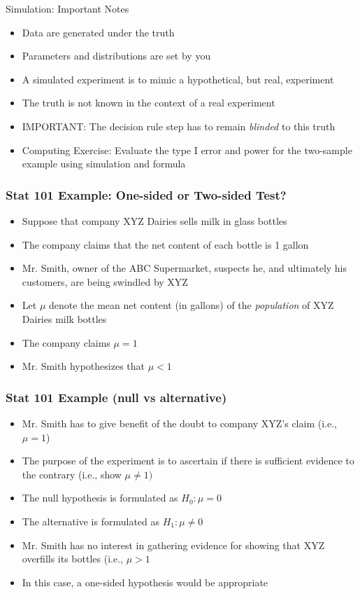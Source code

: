 \documentclass[xcolor=x11names,compress]{beamer}\usepackage[]{graphicx}\usepackage[]{color}
\begin{document}
\begin{frame}{Simulation: Important Notes}
  \begin{itemize}
  \item Data are generated under the truth
  \item Parameters and distributions are set by you
  \item A simulated experiment is to mimic a hypothetical, but real, experiment
  \item The truth is not known in the context of a real experiment
  \item IMPORTANT: The decision rule step has to remain {\it blinded} to this truth
  \item Computing Exercise: Evaluate the type I error and power for the two-sample example
        using simulation and formula
  \end{itemize}
\end{frame}


\begin{frame}
  \frametitle{Stat 101 Example: One-sided or Two-sided Test?}
  \begin{itemize}
  \item Suppose that company XYZ Dairies sells milk in glass bottles
  \item The company claims that the net content of each bottle is 
        1 gallon
  \item Mr. Smith, owner of the ABC Supermarket, suspects
        he, and ultimately his customers, are being swindled by XYZ 
  \item Let $\mu$ denote the mean net content (in gallons)
        of the {\it population} of
        XYZ Dairies milk bottles
  \item The company claims $\mu=1$
  \item Mr. Smith hypothesizes that $\mu <1$
  \end{itemize}
\end{frame}

\begin{frame}
  \frametitle{Stat 101 Example (null vs alternative)}
  \begin{itemize}
\item Mr. Smith has to give benefit of the doubt to company XYZ's claim (i.e.,
      $\mu=1$)
\item The purpose of the experiment is to ascertain if there is
      sufficient evidence to the contrary (i.e., show
      $\mu\ne 1)$
\item The null hypothesis is formulated as $H_0: \mu=0$
\item The alternative is formulated as $H_1: \mu\ne 0$
\item Mr. Smith has no interest in gathering evidence for showing
      that XYZ overfills its bottles (i.e., $\mu>1$
\item In this case, a one-sided hypothesis would be appropriate
  \end{itemize}
\end{frame}
\end{document}
